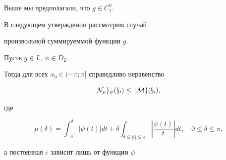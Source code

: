 Выше мы предполагали, что $g\in C^\eta_1$.


В следующем утверждении рассмoтрим случай


произвольной суммируеммой функции $g$.





\begin{thm}


Пусть $g\in L$, $\psi\in D_2$.


Тогда для всех $x_0\in (-\pi;\pi]$ справедливо неравенство


\begin{equation}


\N_\mu g_\psi(x_0)\le cMg(x_0), 


\end{equation}


где


\begin{equation}


\mu(\delta)=\int_{-\delta}^\delta|\psi(t)|dt+


\delta\int_{\delta\le|t|\le\pi}\left|\frac{\psi(t)}{t}\right|dt,


\quad 0\le\delta\le\pi,


\end{equation}


а постоянная $c$ зависит лишь от функции $\psi$.


\end{thm}






